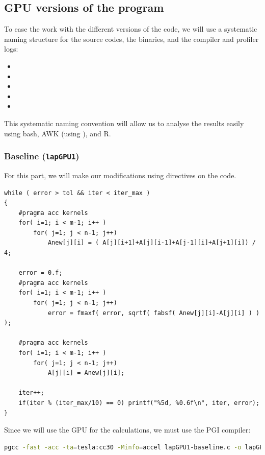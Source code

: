 \subsection{GPU versions of the program}
To ease the work with the different versions of the code, we will use a systematic naming structure for the source codes, the binaries, and the compiler and profiler logs:
\begin{itemize}
	\item {}
	\item {}
	\item {}
	\item {}
	\item {}
\end{itemize}

This systematic naming convention will allow us to analyse the results easily using bash, AWK (using ), and R.

\subsubsection{Baseline (\texttt{lapGPU1})}
For this part, we will make our modifications using  directives on the  code.

\begin{lstlisting}[firstnumber=77]
while ( error > tol && iter < iter_max )
{
	#pragma acc kernels
	for( i=1; i < m-1; i++ )
		for( j=1; j < n-1; j++)
			Anew[j][i] = ( A[j][i+1]+A[j][i-1]+A[j-1][i]+A[j+1][i]) / 4;

	error = 0.f;
	#pragma acc kernels
	for( i=1; i < m-1; i++ )
		for( j=1; j < n-1; j++)
			error = fmaxf( error, sqrtf( fabsf( Anew[j][i]-A[j][i] ) ) );

	#pragma acc kernels
	for( i=1; i < m-1; i++ )
		for( j=1; j < n-1; j++)
			A[j][i] = Anew[j][i];

	iter++;
	if(iter % (iter_max/10) == 0) printf("%5d, %0.6f\n", iter, error);
}
\end{lstlisting}

Since we will use the GPU for the calculations, we must use the PGI compiler:
\begin{lstlisting}[language=bash]
pgcc -fast -acc -ta=tesla:cc30 -Minfo=accel lapGPU1-baseline.c -o lapGPU1 &> lapGPU1-comp.log
\end{lstlisting}

